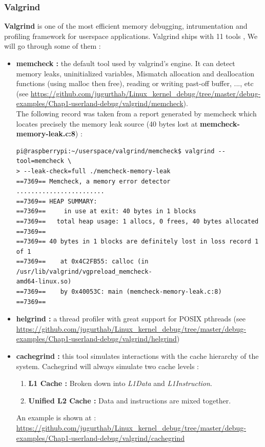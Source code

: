 \subsubsection{Valgrind}
\textbf{Valgrind} is one of the most efficient memory debugging, intrumentation and profiling framework for userspace applications. Valgrind ships with 11 tools , We will go through some of them :
\begin{itemize}
	\item \textbf{memcheck : } the default tool used by valgrind's engine. It can detect memory leaks, uninitialized variables, Mismatch allocation and deallocation functions (using malloc then free), reading or writing past-off buffer, ..., etc (see {\color{blue}\url{https://github.com/jugurthab/Linux_kernel_debug/tree/master/debug-examples/Chap1-userland-debug/valgrind/memcheck}}).\\
	
The following record was taken from a report generated by memcheck which locates precisely the memory leak source (40 bytes lost at \textbf{memcheck-memory-leak.c:8}) :

		\begin{lstlisting}[style=BashInputStyle]
pi@raspberrypi:~/userspace/valgrind/memcheck$ valgrind --tool=memcheck \
> --leak-check=full ./memcheck-memory-leak 
==7369== Memcheck, a memory error detector
........................
==7369== HEAP SUMMARY:
==7369==     in use at exit: 40 bytes in 1 blocks
==7369==   total heap usage: 1 allocs, 0 frees, 40 bytes allocated
==7369== 
==7369== 40 bytes in 1 blocks are definitely lost in loss record 1 of 1
==7369==    at 0x4C2FB55: calloc (in /usr/lib/valgrind/vgpreload_memcheck-
amd64-linux.so)
==7369==    by 0x40053C: main (memcheck-memory-leak.c:8)
==7369== 
		\end{lstlisting}
	
	\item \textbf{helgrind : } a thread profiler with great support for POSIX pthreads (see {\color{blue} \url{https://github.com/jugurthab/Linux_kernel_debug/tree/master/debug-examples/Chap1-userland-debug/valgrind/helgrind}})	
	
	\item \textbf{cachegrind : } this tool simulates interactions with the cache hierarchy of the system. Cachegrind will always simulate two cache levels :
		\begin{enumerate}
			\item {\textbf{L1 Cache :} Broken down into \emph{L1Data} and \emph{L1Instruction}.}
			\item {\textbf{Unified L2 Cache :} Data and instructions are mixed together.}
		\end{enumerate}			
An example is shown at : {\color{blue}\url{https://github.com/jugurthab/Linux_kernel_debug/tree/master/debug-examples/Chap1-userland-debug/valgrind/cachegrind}}
	

\end{itemize}
